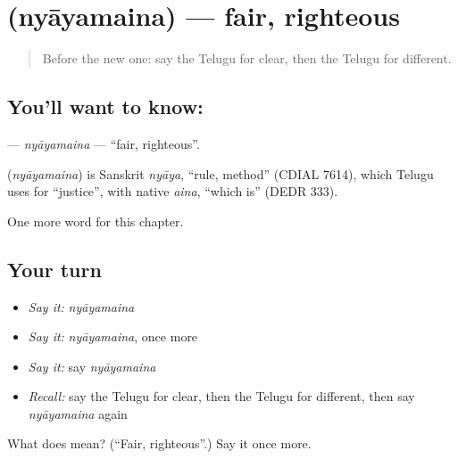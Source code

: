 \section[\texorpdfstring{\te{న్యాయమైన} (nyāyamaina)}{న్యాయమైన (nyāyamaina)}]{ (nyāyamaina) — fair, righteous}

\label{lesson:TE-C222-nyayamaina}



\begin{quote}
Before the new one: say the Telugu for clear, then the Telugu for different.
\end{quote}

\subsection*{You'll want to know: }
\textbf{} — \emph{nyāyamaina} — \textquotedblleft{}fair, righteous\textquotedblright{}.

\begin{cousinweb}
\textbf{} (\emph{nyāyamaina}) is Sanskrit \emph{nyāya}, \textquotedblleft{}rule, method\textquotedblright{} (CDIAL 7614), which Telugu uses for \textquotedblleft{}justice\textquotedblright{}, with native \emph{aina}, \textquotedblleft{}which is\textquotedblright{} (DEDR 333).
\end{cousinweb}

\begin{grammarlens}[title={What you've built}]
One more word for this chapter.
\end{grammarlens}

\subsection*{Your turn}
\begin{itemize}
\raggedright
  \item \emph{Say it:} \emph{nyāyamaina}
  \item \emph{Say it:} \emph{nyāyamaina}, once more
  \item \emph{Say it:} say \emph{nyāyamaina}
  \item \emph{Recall:} say the Telugu for clear, then the Telugu for different, then say \emph{nyāyamaina} again
\end{itemize}

\begin{tcolorbox}[breakable,colback=teal!4,colframe=teal!35!black,title={Before you move on}]
What does  mean? (\textquotedblleft{}Fair, righteous\textquotedblright{}.) Say it once more.
\end{tcolorbox}
